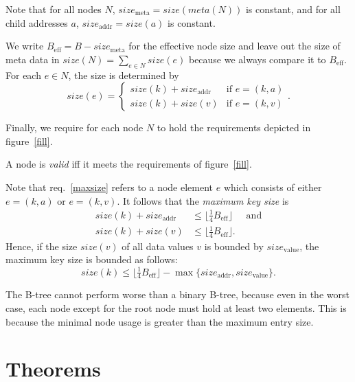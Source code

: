 \documentclass{vldb}
\newcommand \Beff { B_{\text{eff}} }
\begin{document}
\begin{defi}
Note that for all nodes $N$, $size_\text{meta} = size(meta(N))$ is constant,
and for all child addresses $a$, $size_\text{addr} = size(a)$ is constant.

We write $\Beff = B - size_\text{meta}$ for the effective node size and leave
out the size of meta data in $size(N) = \sum_{e \in N} size(e)$ because we
always compare it to $\Beff$.
For each $e \in N$, the size is determined by
\[ size(e) = \begin{cases}
size(k) + size_\text{addr} & \text{if } e = (k,a)\\
size(k) + size(v)          & \text{if } e = (k,v)
\end{cases}. \]

Finally, we require for each node $N$ to hold the requirements depicted in
figure~\ref{fill}.
\end{defi}


\begin{defi}
A node is {\em valid} iff it meets the requirements of figure~\ref{fill}.
\end{defi}


\begin{rem}
Note that req.~\ref{maxsize} refers to a node element $e$ which consists
of either \mbox{$e = (k, a)$} or \mbox{$e = (k, v)$}.
It follows that the {\em maximum key size} is
\begin{align*}
size(k) + size_\text{addr}
    &\leq \lfloor \tfrac{1}{4} \Beff \rfloor & \text{ and}\\
size(k) + size(v)
    &\leq \lfloor \tfrac{1}{4} \Beff \rfloor.
\end{align*}
Hence, if the size $size(v)$ of all data values $v$ is bounded by
$size_\text{value}$, the maximum key size is bounded as follows:
\[ size(k) \leq \lfloor \tfrac{1}{4} \Beff \rfloor 
    - \max \{ size_\text{addr}, size_\text{value} \}. \]
\end{rem}


\begin{rem}
The B-tree cannot perform worse than a binary B-tree, because even in the worst
case, each node except for the root node must hold at least two elements.
This is because the minimal node usage is greater than the maximum entry size.
\end{rem}



\section{Theorems} %
\end{document}
